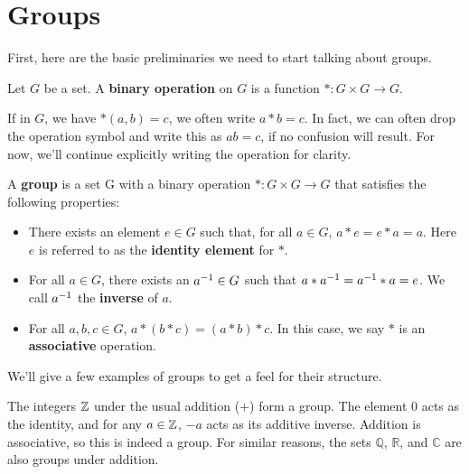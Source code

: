 \section{Groups}

First, here are the basic preliminaries we need to start talking about groups.

\begin{definition}
\label{binaryoperation}
Let $G$ be a set. A \textbf{binary operation} on $G$ is a function $*: G \times G \to G$.
\end{definition}

If in $G$, we have $*(a, b) = c$, we often write $a * b = c$. In fact, we can often drop the operation symbol and write this as $ab = c$, if no confusion will result. For now, we'll continue explicitly writing the operation for clarity.


\begin{definition}
A \textbf{group} is a set G with a binary operation $*: G \times G \to G$ that satisfies the following properties:
\begin{itemize}
    \item There exists an element $e \in G$ such that, for all $a \in G$, $a*e = e*a = a$. Here $e$ is referred to as the \textbf{identity element} for $*$.
    \item For all $a \in G$, there exists an $a^{-1} \in G$ such that $a*a^{-1} = a^{-1}*a = e$. We call $a^{-1}$ the \textbf{inverse} of $a$.
    \item For all $a, b, c \in G$, $a * (b * c) = (a * b) * c$. In this case, we say $*$ is an \textbf{associative} operation.
\end{itemize}
\end{definition}

We'll give a few examples of groups to get a feel for their structure.

\begin{example}
The integers $\mathbb{Z}$ under the usual addition ($+$) form a group. The element $0$ acts as the identity, and for any $a \in \mathbb{Z}$, $-a$ acts as its additive inverse. Addition is associative, so this is indeed a group. For similar reasons, the sets $\mathbb{Q}$, $\mathbb{R}$, and $\mathbb{C}$ are also groups under addition.
\end{example}

